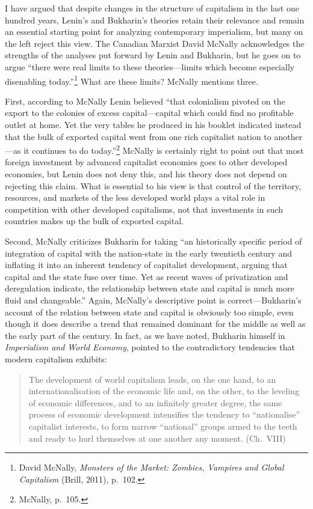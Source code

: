 I have argued that despite changes in the structure of capitalism in the last one hundred years, Lenin's and Bukharin's theories retain their relevance and remain an essential starting point for analyzing contemporary imperialism, but many on the left reject this view. The Canadian Marxist David McNally acknowledges the strengths of the analyses put forward by Lenin and Bukharin, but he goes on to argue ``there were real limits to these theories---limits which become especially disenabling today.''\footnote{David McNally, \emph{Monsters of the Market: Zombies, Vampires and Global Capitalism} (Brill, 2011), p.\ 102.} What are these limits? McNally mentions three.

First, according to McNally Lenin believed ``that colonialism pivoted on the export to the colonies of excess capital---capital which could find no profitable outlet at home. Yet the very tables he produced in his booklet indicated instead that the bulk of exported capital went from one rich capitalist nation to another---as it continues to do today.''\footnote{McNally, p.\ 105.} McNally is certainly right to point out that most foreign investment by advanced capitalist economies goes to other developed economies, but Lenin does not deny this, and his theory does not depend on rejecting this claim. What is essential to his view is that control of the territory, resources, and markets of the less developed world plays a vital role in competition with other developed capitalisms, not that investments in such countries makes up the bulk of exported capital.

Second, McNally criticizes Bukharin for taking ``an historically specific period of integration of capital with the nation-state in the early twentieth century and inflating it into an inherent tendency of capitalist development, arguing that capital and the state fuse over time. Yet as recent waves of privatization and deregulation indicate, the relationship between state and capital is much more fluid and changeable.'' Again, McNally's descriptive point is correct---Bukharin's account of the relation between state and capital is obviously too simple, even though it does describe a trend that remained dominant for the middle as well as the early part of the century. In fact, as we have noted, Bukharin himself in \emph{Imperialism and World Economy}, pointed to the contradictory tendencies that modern capitalism exhibits:

\blockquote{The development of world capitalism leads, on the one hand, to an internationalisation of the economic life and, on the other, to the leveling of economic differences, and to an infinitely greater degree, the same process of economic development intensifies the tendency to ``nationalise'' capitalist interests, to form narrow ``national'' groups armed to the teeth and ready to hurl themselves at one another any moment. (Ch.\ VIII)}

